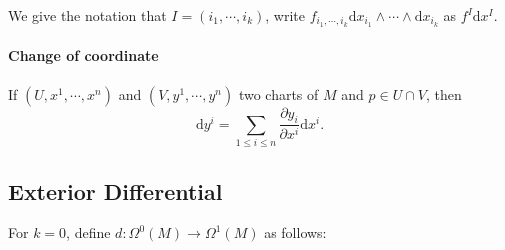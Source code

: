 
We give the notation that  $ I=\left(i_1,\cdots,i_k\right) $, write  $ f_{i_1,\cdots,i_k}\mathrm{d}x_{i_1}\wedge\cdots\wedge \mathrm{d}x_{i_k} $ as  $ f^I\mathrm{d}x^I $.
\paragraph{Change of coordinate} If  $ (U,x^1,\cdots,x^n) $ and  $ (V,y^1,\cdots,y^n)$ two charts of  $ M $ and  $ p\in U\cap V $, then
\begin{equation}
    \mathrm{d}y^i=\sum_{1 \leq i \leq n}\frac{\partial y_i}{\partial x^i}\mathrm{d}x^i.
\end{equation}
\subsection{Exterior Differential}
For  $ k=0 $, define  $ d:\Omega^0(M)\rightarrow \Omega^1(M) $ as follows:

